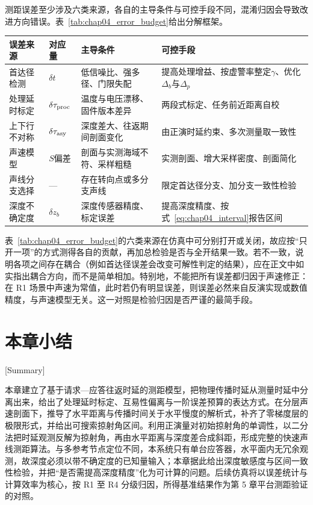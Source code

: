 测距误差至少涉及六类来源，各自的主导条件与可控手段不同，混淆归因会导致改进方向错误。表~\ref{tab:chap04_error_budget}给出分解框架。

\begin{table}[htbp]
 \vspace{0.5em}\centering\wuhao
 \begin{tabularx}{\linewidth}{@{}l l X X@{}}
 \toprule[1.5pt]
 误差来源 & 对应量 & 主导条件 & 可控手段\\
 \midrule[1pt]
 首达径检测 & $\delta t$ & 低信噪比、强多径、门限失配 & 提高处理增益、按虚警率整定$\gamma$、优化$\Delta_b$与$\Delta_p$\\
 处理延时标定 & $\delta\tau_{\rm proc}$ & 温度与电压漂移、固件版本差异 & 两段式标定、任务前近距离自校\\
 上下行不对称 & $\delta\tau_{\rm asy}$ & 深度差大、往返期间剖面变化 & 由正演时延约束、多次测量取一致性\\
 声速模型 & $S$偏差 & 剖面与实测海域不符、采样粗糙 & 实测剖面、增大采样密度、剖面简化\\
 声线分支选择 & — & 存在转向点或多分支声线 & 限定首达径分支、加分支一致性检验\\
 深度不确定度 & $\delta z_b$ & 深度传感器精度、标定误差 & 提高深度精度、按式~\eqref{eq:chap04_interval}报告区间\\
 \bottomrule[1.5pt]
 \end{tabularx}
\end{table}

表~\ref{tab:chap04_error_budget}的六类来源在仿真中可分别打开或关闭，故应按“只开一项”的方式测得各自的贡献，再加总检验是否与全开结果一致。若不一致，说明各项之间存在耦合（例如首达径误差会改变可解性判定的结果），应在正文中如实指出耦合方向，而不是简单相加。特别地，不能把所有误差都归因于声速修正：在 R1 场景中声速为常值，此时若仍有明显误差，则误差必然来自反演实现或数值精度，与声速模型无关。这一对照是检验归因是否严谨的最简手段。

\section{本章小结}[Summary]

本章建立了基于请求—应答往返时延的测距模型，把物理传播时延从测量时延中分离出来，给出了处理延时标定、互易性偏离与一阶误差预算的表达方式。在分层声速剖面下，推导了水平距离与传播时间关于水平慢度的解析式，补齐了零梯度层的极限形式，并给出可搜索掠射角区间。利用正演量对初始掠射角的单调性，以二分法把时延观测反解为掠射角，再由水平距离与深度差合成斜距，形成完整的快速声线测距算法。与多参考节点定位不同，本系统只有单台应答器，水平面内无冗余观测，故深度必须以带不确定度的已知量输入；本章据此给出深度敏感度与区间一致性检验，并把“是否需提高深度精度”化为可计算的问题。后续仿真将以误差统计与计算效率为核心，按 R1 至 R4 分级归因，所得基准结果作为第 5 章平台测距验证的对照。

\FloatBarrier
